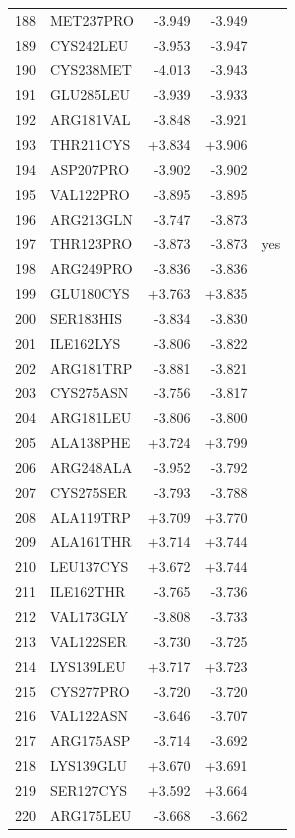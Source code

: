 \begin{longtable}{r l r r c}
188 & MET237PRO & -3.949 & -3.949 &  \\
189 & CYS242LEU & -3.953 & -3.947 &  \\
190 & CYS238MET & -4.013 & -3.943 &  \\
191 & GLU285LEU & -3.939 & -3.933 &  \\
192 & ARG181VAL & -3.848 & -3.921 &  \\
193 & THR211CYS & +3.834 & +3.906 &  \\
194 & ASP207PRO & -3.902 & -3.902 &  \\
195 & VAL122PRO & -3.895 & -3.895 &  \\
196 & ARG213GLN & -3.747 & -3.873 &  \\
197 & THR123PRO & -3.873 & -3.873 & yes \\
198 & ARG249PRO & -3.836 & -3.836 &  \\
199 & GLU180CYS & +3.763 & +3.835 &  \\
200 & SER183HIS & -3.834 & -3.830 &  \\
201 & ILE162LYS & -3.806 & -3.822 &  \\
202 & ARG181TRP & -3.881 & -3.821 &  \\
203 & CYS275ASN & -3.756 & -3.817 &  \\
204 & ARG181LEU & -3.806 & -3.800 &  \\
205 & ALA138PHE & +3.724 & +3.799 &  \\
206 & ARG248ALA & -3.952 & -3.792 &  \\
207 & CYS275SER & -3.793 & -3.788 &  \\
208 & ALA119TRP & +3.709 & +3.770 &  \\
209 & ALA161THR & +3.714 & +3.744 &  \\
210 & LEU137CYS & +3.672 & +3.744 &  \\
211 & ILE162THR & -3.765 & -3.736 &  \\
212 & VAL173GLY & -3.808 & -3.733 &  \\
213 & VAL122SER & -3.730 & -3.725 &  \\
214 & LYS139LEU & +3.717 & +3.723 &  \\
215 & CYS277PRO & -3.720 & -3.720 &  \\
216 & VAL122ASN & -3.646 & -3.707 &  \\
217 & ARG175ASP & -3.714 & -3.692 &  \\
218 & LYS139GLU & +3.670 & +3.691 &  \\
219 & SER127CYS & +3.592 & +3.664 &  \\
220 & ARG175LEU & -3.668 & -3.662 &  \\

\end{longtable}
